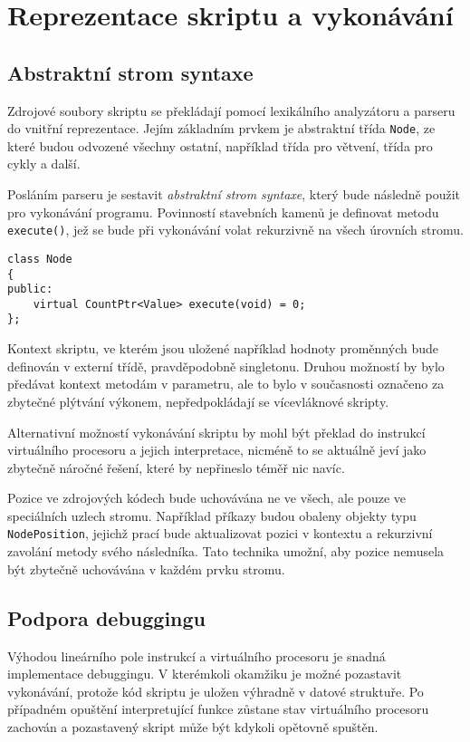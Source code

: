 \documentclass[11pt,twoside,a4paper]{book}
\begin{document}
\section{Reprezentace skriptu a vykonávání}

\subsection{Abstraktní strom syntaxe}
\label{abstraktni_strom_syntaxe}

Zdrojové soubory skriptu se překládají pomocí lexikálního analyzátoru a parseru do vnitřní reprezentace. Jejím základním prvkem je abstraktní třída \texttt{Node}, ze které budou odvozené všechny ostatní, například třída pro větvení, třída pro cykly a další.

Posláním parseru je sestavit \textit{abstraktní strom syntaxe}, který bude následně použit pro vykonávání programu. Povinností stavebních kamenů je definovat metodu \texttt{execute()}, jež se bude při vykonávání volat rekurzivně na všech úrovních stromu.

\begin{verbatim}
class Node
{
public:
    virtual CountPtr<Value> execute(void) = 0;
};
\end{verbatim}

Kontext skriptu, ve kterém jsou uložené například hodnoty proměnných bude definován v externí třídě, pravděpodobně singletonu. Druhou možností by bylo předávat kontext metodám v parametru, ale to bylo v současnosti označeno za zbytečné plýtvání výkonem, nepředpokládají se vícevláknové skripty.

Alternativní možností vykonávání skriptu by mohl být překlad do instrukcí virtuálního procesoru a jejich interpretace, nicméně to se aktuálně jeví jako zbytečně náročné řešení, které by nepřineslo téměř nic navíc.

Pozice ve zdrojových kódech bude uchovávána ne ve všech, ale pouze ve speciálních uzlech stromu. Například příkazy budou obaleny objekty typu \texttt{NodePosition}, jejichž prací bude aktualizovat pozici v kontextu a rekurzivní zavolání metody svého následníka. Tato technika umožní, aby pozice nemusela být zbytečně uchovávána v každém prvku stromu.


\subsection{Podpora debuggingu}

Výhodou lineárního pole instrukcí a virtuálního procesoru je snadná implementace debuggingu. V kterémkoli okamžiku je možné pozastavit vykonávání, protože kód skriptu je uložen výhradně v datové struktuře. Po případném opuštění interpretující funkce zůstane stav virtuálního procesoru zachován a pozastavený skript může být kdykoli opětovně spuštěn.
\end{document}
